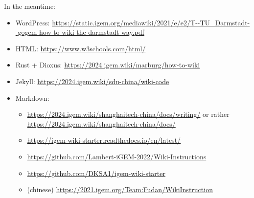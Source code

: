 
In the meantime:

\begin{itemize}
    \item WordPress: \url{https://static.igem.org/mediawiki/2021/e/e2/T--TU_Darmstadt--gogem-how-to-wiki-the-darmstadt-way.pdf}
    \item HTML: \url{https://www.w3schools.com/html/}
    \item Rust + Dioxus: \url{https://2024.igem.wiki/marburg/how-to-wiki}
    \item Jekyll: \url{https://2024.igem.wiki/sdu-china/wiki-code}
    \item Markdown:
    \begin{itemize}
        \item \url{https://2024.igem.wiki/shanghaitech-china/docs/writing/} or rather \url{https://2024.igem.wiki/shanghaitech-china/docs/}
        \item \url{https://igem-wiki-starter.readthedocs.io/en/latest/}
        \item \url{https://github.com/Lambert-iGEM-2022/Wiki-Instructions}
        \item \url{https://github.com/DKSA1/igem-wiki-starter}
        \item (chinese) \url{https://2021.igem.org/Team:Fudan/WikiInstruction}
    \end{itemize}
\end{itemize}
